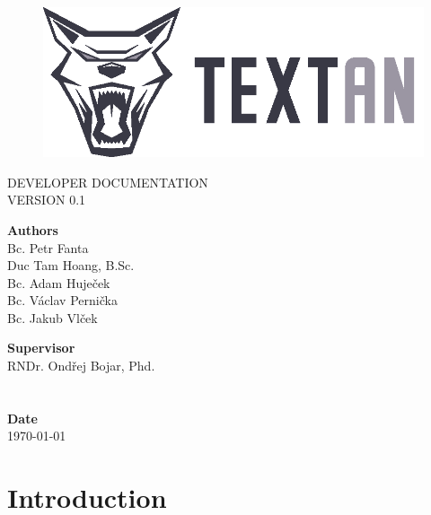 \documentclass[12pt,a4paper]{report}
\begin{document}
\begin{titlepage}
\BgThispage
{}

\begin{figure}
 \includegraphics{../Logos/TEXTAN_logo_grey_B}
\end{figure}
\noindent
\textcolor{TextanRed}{\chapterfont\fontsize{48pt}{1pt}\selectfont\MakeUppercase{Developer documentation}}\\[15pt]
\textcolor{TextanDarkRed}{\sectionfont\LARGE\MakeUppercase{Version 0.1}}

\vfill
\noindent
\begin{minipage}[b]{.65\textwidth}
\textbf{Authors}\\
Bc. Petr Fanta\\
Duc Tam Hoang, B.Sc.\\
Bc. Adam Huječek\\
Bc. Václav Pernička\\
Bc. Jakub Vlček
\end{minipage}%
\begin{minipage}[b]{.35\textwidth}
\textbf{Supervisor} \\
RNDr. Ondřej Bojar, Phd.\\
\\
\\
\textbf{Date}\\
\today
\end{minipage}

\end{titlepage}
\restoregeometry

\tableofcontents



\chapter{Introduction}
\end{document}

